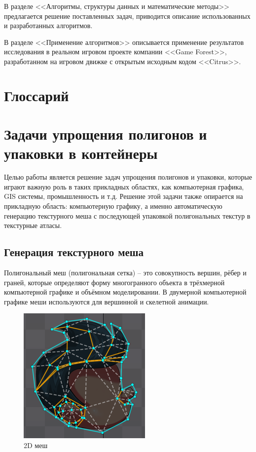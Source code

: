 \documentclass{fefu_thesis/cls/fefu}
\begin{document}
    В разделе <<Алгоритмы, структуры данных и математические методы>> предлагается решение поставленных задач, приводится описание использованных и разработанных алгоритмов.

    В разделе <<Применение алгоритмов>> описывается применение результатов исследования в реальном игровом проекте компании <<Game Forest>>, разработанном на игровом движке с открытым исходным кодом <<Citrus>>.

    \section*{Глоссарий}
    \pagebreak
    \section{Задачи упрощения полигонов и упаковки в контейнеры}

    Целью работы является решение задач упрощения полигонов и упаковки, которые играют важную роль в таких прикладных областях, как компьютерная графика, GIS системы, промышленность и т.д. Решение этой задачи также опирается на прикладную область: компьютерную графику, а именно автоматическую генерацию текстурного меша с последующей упаковкой полигональных текстур в текстурные атласы.

    \subsection{Генерация текстурного меша}
    \label{TextureMeshGeneration}
    Полигональный меш (полигональная сетка) -- это совокупность вершин, рёбер и граней, которые определяют форму многогранного объекта в трёхмерной компьютерной графике и объёмном моделировании. В двумерной компьютерной графике меши используются для вершинной и скелетной анимации.

    \begin{figure}[H]
        \centering
        \includegraphics[scale=0.5]{images/spine_mesh.png}
        \caption{2D меш}
    \end{figure}
\end{document}
